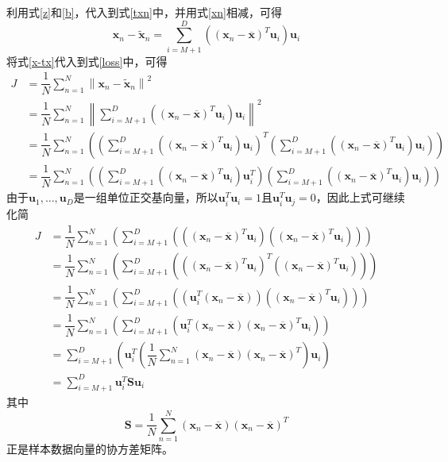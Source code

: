 利用式\ref{z}和\ref{b}，代入到式\ref{txn}中，并用式\ref{xn}相减，可得
\begin{equation}
    \mathbf{x}_n-\tilde{\mathbf{x}}_n=\sum^D_{i=M+1}\left(\left(\mathbf{x}_n-\overline{\mathbf{x}}\right)^T\mathbf{u}_i\right)\mathbf{u}_i
    \label{x-tx}
\end{equation}
将式\ref{x-tx}代入到式\ref{loss}中，可得
\begin{align}
    J
    &= \dfrac{1}{N}\sum^N_{n=1}\left\lVert\mathbf{x}_n-\tilde{\mathbf{x}}_n\right\rVert ^2 \\
    &= \dfrac{1}{N}\sum^N_{n=1}\left\lVert\sum^D_{i=M+1}\left(\left(\mathbf{x}_n-\overline{\mathbf{x}}\right)^T\mathbf{u}_i\right)\mathbf{u}_i\right\rVert ^2 \\
    &= \dfrac{1}{N}\sum^N_{n=1}\left(\left(\sum^D_{i=M+1}\left(\left(\mathbf{x}_n-\overline{\mathbf{x}}\right)^T\mathbf{u}_i\right)\mathbf{u}_i\right)^T\left(\sum^D_{i=M+1}\left(\left(\mathbf{x}_n-\overline{\mathbf{x}}\right)^T\mathbf{u}_i\right)\mathbf{u}_i\right)\right) \\
    &= \dfrac{1}{N}\sum^N_{n=1}\left(\left(\sum^D_{i=M+1}\left(\left(\mathbf{x}_n-\overline{\mathbf{x}}\right)^T\mathbf{u}_i\right)\mathbf{u}^T_i\right)\left(\sum^D_{i=M+1}\left(\left(\mathbf{x}_n-\overline{\mathbf{x}}\right)^T\mathbf{u}_i\right)\mathbf{u}_i\right)\right)
\end{align}
由于$\mathbf{u}_1, \ldots, \mathbf{u}_D$是一组单位正交基向量，所以$\mathbf{u}^T_i\mathbf{u}_i=1$且$\mathbf{u}^T_i\mathbf{u}_j=0$，因此上式可继续化简
\begin{align}
    J
    &= \dfrac{1}{N}\sum^N_{n=1}\left(\sum^D_{i=M+1}\left(\left(\left(\mathbf{x}_n-\overline{\mathbf{x}}\right)^T\mathbf{u}_i\right)\left(\left(\mathbf{x}_n-\overline{\mathbf{x}}\right)^T\mathbf{u}_i\right)\right)\right) \\
    &= \dfrac{1}{N}\sum^N_{n=1}\left(\sum^D_{i=M+1}\left(\left(\left(\mathbf{x}_n-\overline{\mathbf{x}}\right)^T\mathbf{u}_i\right)^T\left(\left(\mathbf{x}_n-\overline{\mathbf{x}}\right)^T\mathbf{u}_i\right)\right)\right) \\
    &= \dfrac{1}{N}\sum^N_{n=1}\left(\sum^D_{i=M+1}\left(\left(\mathbf{u}^T_i\left(\mathbf{x}_n-\overline{\mathbf{x}}\right)\right)\left(\left(\mathbf{x}_n-\overline{\mathbf{x}}\right)^T\mathbf{u}_i\right)\right)\right) \\
    &= \dfrac{1}{N}\sum^N_{n=1}\left(\sum^D_{i=M+1}\left(\mathbf{u}^T_i\left(\mathbf{x}_n-\overline{\mathbf{x}}\right)\left(\mathbf{x}_n-\overline{\mathbf{x}}\right)^T\mathbf{u}_i\right)\right) \\
    &= \sum^D_{i=M+1}\left(\mathbf{u}^T_i\left(\dfrac{1}{N}\sum^N_{n=1}\left(\mathbf{x}_n-\overline{\mathbf{x}}\right)\left(\mathbf{x}_n-\overline{\mathbf{x}}\right)^T\right)\mathbf{u}_i\right) \\
    &= \sum^D_{i=M+1}\mathbf{u}^T_i\mathbf{S}\mathbf{u}_i
\end{align}
其中
\begin{equation}
    \mathbf{S}=\dfrac{1}{N}\sum^N_{n=1}\left(\mathbf{x}_n-\overline{\mathbf{x}}\right)\left(\mathbf{x}_n-\overline{\mathbf{x}}\right)^T
\end{equation}
正是样本数据向量的协方差矩阵。

